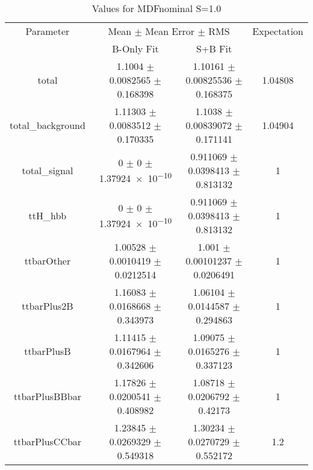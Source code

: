\begin{table}
\centering
\caption{Values for MDFnominal S=1.0}
\begin{tabular}{cccc}
\toprule
Parameter & \multicolumn{2}{c}{Mean $\pm$ Mean Error $\pm$ RMS} & Expectation\\
 & B-Only Fit & S+B Fit & \\
\midrule
total & \num{1.1004} $\pm$ \num{0.0082565} $\pm$ \num{0.168398} & \num{1.10161} $\pm$ \num{0.00825536} $\pm$ \num{0.168375} & \num{1.04808}\\
total\_background & \num{1.11303} $\pm$ \num{0.0083512} $\pm$ \num{0.170335} & \num{1.1038} $\pm$ \num{0.00839072} $\pm$ \num{0.171141} & \num{1.04904}\\
total\_signal & \num{0} $\pm$ \num{0} $\pm$ \num{1.37924e-10} & \num{0.911069} $\pm$ \num{0.0398413} $\pm$ \num{0.813132} & \num{1}\\
ttH\_hbb & \num{0} $\pm$ \num{0} $\pm$ \num{1.37924e-10} & \num{0.911069} $\pm$ \num{0.0398413} $\pm$ \num{0.813132} & \num{1}\\
ttbarOther & \num{1.00528} $\pm$ \num{0.0010419} $\pm$ \num{0.0212514} & \num{1.001} $\pm$ \num{0.00101237} $\pm$ \num{0.0206491} & \num{1}\\
ttbarPlus2B & \num{1.16083} $\pm$ \num{0.0168668} $\pm$ \num{0.343973} & \num{1.06104} $\pm$ \num{0.0144587} $\pm$ \num{0.294863} & \num{1}\\
ttbarPlusB & \num{1.11415} $\pm$ \num{0.0167964} $\pm$ \num{0.342606} & \num{1.09075} $\pm$ \num{0.0165276} $\pm$ \num{0.337123} & \num{1}\\
ttbarPlusBBbar & \num{1.17826} $\pm$ \num{0.0200541} $\pm$ \num{0.408982} & \num{1.08718} $\pm$ \num{0.0206792} $\pm$ \num{0.42173} & \num{1}\\
ttbarPlusCCbar & \num{1.23845} $\pm$ \num{0.0269329} $\pm$ \num{0.549318} & \num{1.30234} $\pm$ \num{0.0270729} $\pm$ \num{0.552172} & \num{1.2}\\
\bottomrule
\end{tabular}
\end{table}